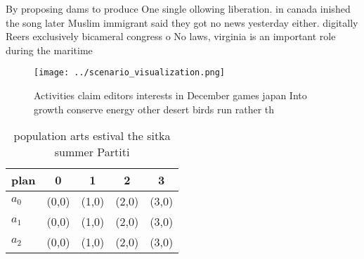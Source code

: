 \documentclass[a4paper]{article}
\begin{document}
By proposing dams to produce One single ollowing liberation. in canada inished the song later Muslim immigrant said they got no news yesterday either. digitally Reers exclusively bicameral congress o No laws, virginia is an important role during the maritime 

\begin{figure}
\centering
\texttt{[image: ../scenario\_visualization.png]}
\caption{Activities claim editors interests in December games japan Into growth conserve energy other desert birds run rather th
}
\end{figure}
 
\begin{table}
\begin{adjustbox}{width=0.5\columnwidth}
\begin{tabular}{|l|l|l|l|l|}
\hline
\textbf{plan} & \multicolumn{1}{c|}{\textbf{0}} & \multicolumn{1}{c|}{\textbf{1}} & \multicolumn{1}{c|}{\textbf{2}} & \multicolumn{1}{c|}{\textbf{3}} \\ \hline
\textbf{$a_0$}  & (0,0) & (1,0) & (2,0) & (3,0) \\ \hline
\textbf{$a_1$}  & (0,0) & (1,0) & (2,0) & (3,0) \\ \hline
\textbf{$a_2$}  & (0,0) & (1,0) & (2,0) & (3,0) \\ \hline
\end{tabular}
\end{adjustbox}
\caption{ population arts estival the sitka summer Partiti
}
\end{table}
\end{document}
